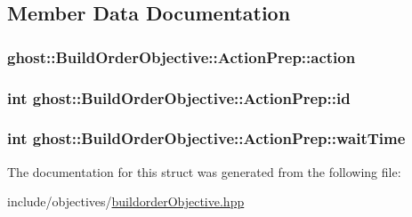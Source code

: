 \subsection{Member Data Documentation}
\hypertarget{structghost_1_1BuildOrderObjective_1_1ActionPrep_a9bec671b44077070fe7cc852d380c138}{
\subsubsection[{action}]{ ghost\-::\-Build\-Order\-Objective\-::\-Action\-Prep\-::action}}\label{structghost_1_1BuildOrderObjective_1_1ActionPrep_a9bec671b44077070fe7cc852d380c138}
\hypertarget{structghost_1_1BuildOrderObjective_1_1ActionPrep_a2a3b997dfc60079d09320feca67b848e}{
\subsubsection[{id}]{\setlength{\rightskip}{0pt plus 5cm}int ghost\-::\-Build\-Order\-Objective\-::\-Action\-Prep\-::id}}\label{structghost_1_1BuildOrderObjective_1_1ActionPrep_a2a3b997dfc60079d09320feca67b848e}
\hypertarget{structghost_1_1BuildOrderObjective_1_1ActionPrep_af8a3d62c358363a6db4b392cd3f8237c}{
\subsubsection[{wait\-Time}]{\setlength{\rightskip}{0pt plus 5cm}int ghost\-::\-Build\-Order\-Objective\-::\-Action\-Prep\-::wait\-Time}}\label{structghost_1_1BuildOrderObjective_1_1ActionPrep_af8a3d62c358363a6db4b392cd3f8237c}


The documentation for this struct was generated from the following file\-:\begin{DoxyCompactItemize}
\item 
include/objectives/\hyperlink{buildorderObjective_8hpp}{buildorder\-Objective.\-hpp}\end{DoxyCompactItemize}
